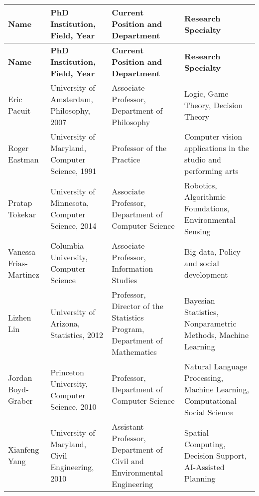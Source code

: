 


\begin{longtable}{p{2cm}p{3cm}p{4cm}p{4cm}}
\hline
\textbf{Name} & \textbf{PhD Institution, Field, Year} & \textbf{Current Position and Department} & \textbf{Research Specialty} \\
\hline
\endfirsthead
\hline
\textbf{Name} & \textbf{PhD Institution, Field, Year} & \textbf{Current Position and Department} & \textbf{Research Specialty} \\
\hline
\endhead
\hline
\endfoot
\hline
\endlastfoot
Eric Pacuit & University of Amsterdam, Philosophy, 2007 & Associate Professor, Department of Philosophy & Logic, Game Theory, Decision Theory \\
\hline
Roger Eastman & University of Maryland, Computer Science, 1991 & Professor of the Practice & Computer vision applications in the studio and performing arts \\
\hline
Pratap Tokekar & University of Minnesota, Computer Science, 2014 & Associate Professor, Department of Computer Science & Robotics, Algorithmic Foundations, Environmental Sensing \\
\hline
Vanessa Frias-Martinez & Columbia University, Computer Science & Associate Professor, Information Studies & Big data, Policy and social development \\
\hline
Lizhen Lin & University of Arizona, Statistics, 2012 & Professor, Director of the Statistics Program, Department of Mathematics & Bayesian Statistics, Nonparametric Methods, Machine Learning \\
\hline
Jordan Boyd-Graber & Princeton University, Computer Science, 2010 &  Professor, Department of Computer Science & Natural Language Processing, Machine Learning, Computational Social Science \\
\hline
Xianfeng Yang & University of Maryland, Civil Engineering, 2010 & Assistant Professor, Department of Civil and Environmental
Engineering & Spatial Computing, Decision Support, AI-Assisted Planning \\
\end{longtable}


